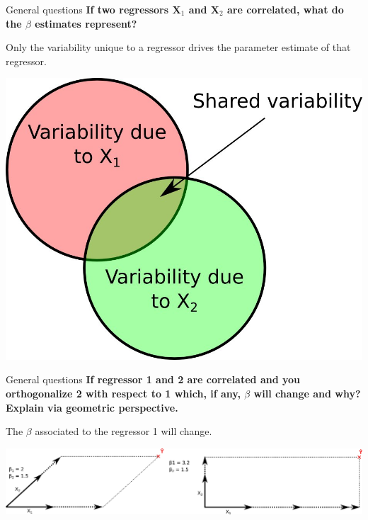 \documentclass{beamer}
\begin{document}
\begin{frame}{General questions}
\textbf{If two regressors X$_{1}$ and X$_{2}$ are correlated, what do the $\beta$ estimates represent?}

\smallskip 
Only the variability unique to a regressor drives the parameter estimate of that regressor.

\smallskip
    \begin{center}
      \includegraphics[scale=0.6,keepaspectratio=true]{./CorrelatedRegressors.jpg}
    \end{center}
\end{frame} 


\begin{frame}{General questions}
\textbf{If regressor 1 and 2 are correlated and you orthogonalize 2 with respect to 1 which, if any, $\beta$ will change and why? Explain via geometric perspective.}
  
\smallskip   
The $\beta$ associated to the regressor 1 will change.

\smallskip  
    \begin{flushleft}
    \includegraphics[scale=0.27,keepaspectratio=true]{./Ortho_And_Non-Ortho_Regressors.jpg}
    \end{flushleft}
\end{frame} 
\end{document}
